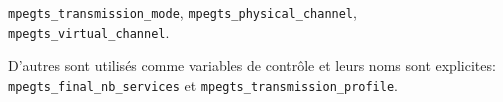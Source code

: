 \documentclass[12pt,a4paper]{article}
\begin{document}
\texttt{mpegts\hspace{0.1mm}\hspace{0.1mm}\_\hspace{0.1mm}\hspace{0.1mm}transmission\hspace{0.1mm}\hspace{0.1mm}\_\hspace{0.1mm}\hspace{0.1mm}mode}, \texttt{mpegts\hspace{0.1mm}\hspace{0.1mm}\_\hspace{0.1mm}\hspace{0.1mm}physical\hspace{0.1mm}\hspace{0.1mm}\_\hspace{0.1mm}\hspace{0.1mm}channel}, \texttt{mpegts\hspace{0.1mm}\hspace{0.1mm}\_\hspace{0.1mm}\hspace{0.1mm}virtual\hspace{0.1mm}\hspace{0.1mm}\_\hspace{0.1mm}\hspace{0.1mm}channel}.

D'autres sont utilisés comme variables de contrôle et leurs noms sont explicites: \texttt{mpegts\hspace{0.1mm}\hspace{0.1mm}\_\hspace{0.1mm}\hspace{0.1mm}final\hspace{0.1mm}\hspace{0.1mm}\_\hspace{0.1mm}\hspace{0.1mm}nb\hspace{0.1mm}\hspace{0.1mm}\_\hspace{0.1mm}\hspace{0.1mm}services} et \texttt{mpegts\hspace{0.1mm}\hspace{0.1mm}\_\hspace{0.1mm}\hspace{0.1mm}transmission\hspace{0.1mm}\hspace{0.1mm}\_\hspace{0.1mm}\hspace{0.1mm}profile}.
\end{document}
